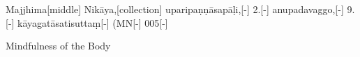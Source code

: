 
\begin{samepage}
\begingl[glneveryline={\PaliGlossA,\PaliGlossB}]
Majjhima[middle] Nikāya,[collection] uparipaṇṇāsapāḷi,[-] 2.[-] anupadavaggo,[-] 9.[-] kāyagatāsatisuttaṃ[-] (MN[-] 005[-]
\endgl
\nopagebreak
\linespread{0.5}
\begin{spacin}{0.2}
{\PaliGlossFT Mindfulness of the Body}
\end{spacin}
\vskip 12pt
\end{samepage}

